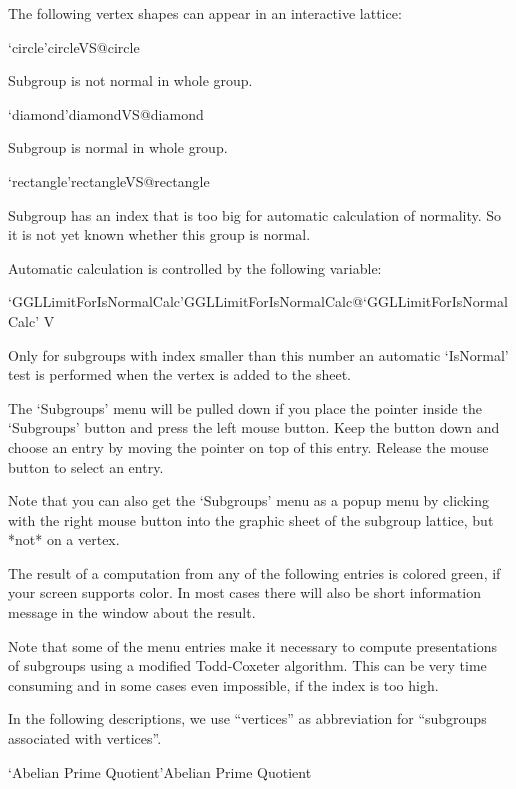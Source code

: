 The following vertex shapes can appear in an interactive lattice:

\>`circle'{circleVS}@{circle}

  Subgroup is not normal in whole group.

\>`diamond'{diamondVS}@{diamond}

  Subgroup is normal in whole group.

\>`rectangle'{rectangleVS}@{rectangle}

  Subgroup has an index that is too big for automatic calculation of
  normality. So it is not yet known whether this group is normal.

\bigskip

Automatic calculation is controlled by the following variable:

\>`GGLLimitForIsNormalCalc'{GGLLimitForIsNormalCalc}@{`GGLLimitForIsNormalCalc'} V

  Only for subgroups with index smaller than this number an automatic
  `IsNormal' test is performed when the vertex is added to the sheet.



The `Subgroups' menu will be pulled down  if you place the pointer inside
the `Subgroups' button and press the  left mouse button.  Keep the button
down and  choose an entry by  moving  the pointer on   top of this entry.
Release the mouse button to select an entry.

Note that you can also get the `Subgroups' menu as a popup menu by
clicking with the right mouse button into the graphic sheet of the subgroup
lattice, but *not* on a vertex.

The result of  a computation  from any  of  the following entries  is
colored green, if  your screen supports color.   In most cases there will
also be short information message in the {\GAP} window about the result.

Note that  some of   the menu entries  make  it  necessary  to compute
presentations of subgroups   using a modified Todd-Coxeter  algorithm. 
This can be very time consuming and  in some cases even impossible, if
the index is too high.

In  the following descriptions, we  use ``vertices'' as abbreviation for
``subgroups associated with vertices''.

\>`Abelian Prime Quotient'{Abelian Prime Quotient}

